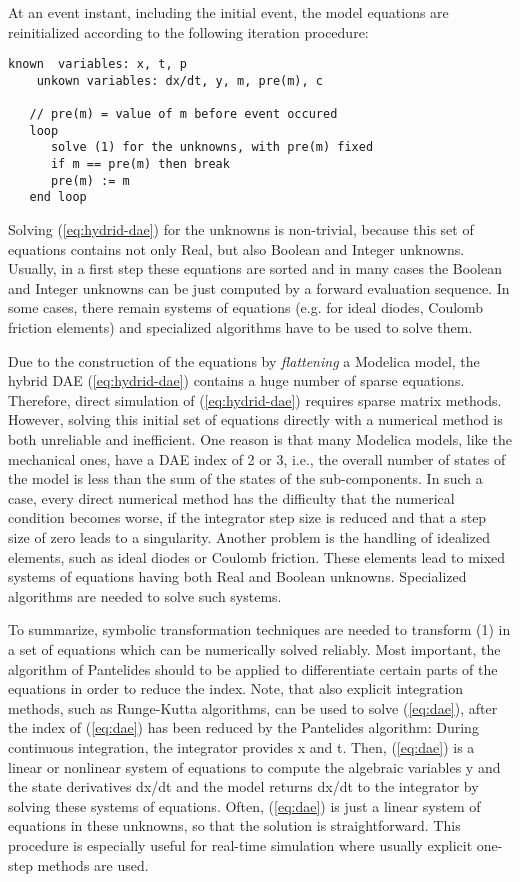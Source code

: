 At an event instant, including the initial event, the model equations
are reinitialized according to the following iteration procedure:
\begin{lstlisting}[language=modelica]
    known  variables: x, t, p
    unkown variables: dx/dt, y, m, pre(m), c

   // pre(m) = value of m before event occured
   loop
      solve (1) for the unknowns, with pre(m) fixed
      if m == pre(m) then break
      pre(m) := m
   end loop
\end{lstlisting}
Solving (\ref{eq:hydrid-dae}) for the unknowns is non-trivial, because this set of
equations contains not only Real, but also Boolean and Integer unknowns.
Usually, in a first step these equations are sorted and in many cases
the Boolean and Integer unknowns can be just computed by a forward
evaluation sequence. In some cases, there remain systems of equations
(e.g. for ideal diodes, Coulomb friction elements) and specialized
algorithms have to be used to solve them.

Due to the construction of the equations by \emph{flattening} a Modelica
model, the hybrid DAE (\ref{eq:hydrid-dae}) contains a huge number of sparse equations.
Therefore, direct simulation of (\ref{eq:hydrid-dae}) requires sparse matrix methods.
However, solving this initial set of equations directly with a numerical
method is both unreliable and inefficient. One reason is that many
Modelica models, like the mechanical ones, have a DAE index of 2 or 3,
i.e., the overall number of states of the model is less than the sum of
the states of the sub-components. In such a case, every direct numerical
method has the difficulty that the numerical condition becomes worse, if
the integrator step size is reduced and that a step size of zero leads
to a singularity. Another problem is the handling of idealized elements,
such as ideal diodes or Coulomb friction. These elements lead to mixed
systems of equations having both Real and Boolean unknowns. Specialized
algorithms are needed to solve such systems.

To summarize, symbolic transformation techniques are needed to transform
(1) in a set of equations which can be numerically solved reliably. Most
important, the algorithm of Pantelides should to be applied to
differentiate certain parts of the equations in order to reduce the
index. Note, that also explicit integration methods, such as Runge-Kutta
algorithms, can be used to solve (\ref{eq:dae}), after the index of (\ref{eq:dae}) has been
reduced by the Pantelides algorithm: During continuous integration, the
integrator provides x and t. Then, (\ref{eq:dae}) is a linear or nonlinear system
of equations to compute the algebraic variables y and the state
derivatives dx/dt and the model returns dx/dt to the integrator by
solving these systems of equations. Often, (\ref{eq:dae}) is just a linear system
of equations in these unknowns, so that the solution is straightforward.
This procedure is especially useful for real-time simulation where
usually explicit one-step methods are used.
